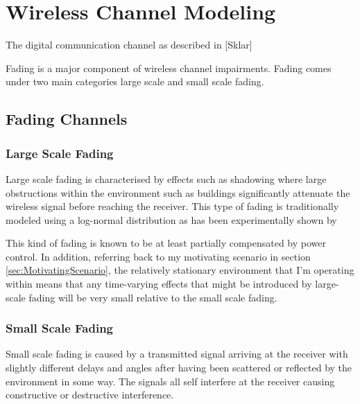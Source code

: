 \chapter{Wireless Channel Modeling}

The digital communication channel as described in %
[Sklar] %

Fading is a major component of wireless channel %
impairments. Fading comes under two main categories %
large scale and small scale fading.


\section{Fading Channels}

\subsection{Large Scale Fading}
Large scale %
fading is characterised by effects such as shadowing %
where large obstructions within the environment such as %
buildings significantly attenuate the wireless signal %
before reaching the receiver. This type of fading is %
traditionally modeled using a log-normal distribution %
as has been experimentally shown by 

This kind of fading is known to be at least partially %
compensated by power control\cite{Jer00}. In addition, %
referring back to my motivating scenario in section %
\ref{sec:MotivatingScenario}, the relatively stationary %
environment that I'm operating within means that any time-varying %
effects that might be introduced by large-scale fading %
will be very small relative to the small scale fading. 

\subsection{Small Scale Fading}

Small scale fading is caused by a transmitted signal %
arriving at the receiver with slightly different delays %
and angles after having been scattered or reflected by %
the environment in some way. The signals all self %
interfere at the receiver causing constructive or %
destructive interference. 

